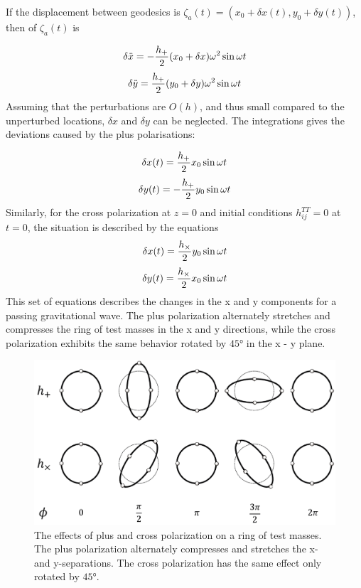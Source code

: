 \documentclass[binding=0.6cm, LaM]{sapthesis}
\begin{document}
If the displacement between geodesics is $\zeta_a (t) = (x_0 + \delta x(t), y_0 + \delta y(t))$, then of $\zeta_a (t)$ is 

\begin{equation}
\delta {\ddot x} = - {{h_{+}} \over 2} (x_0 + \delta x) \omega ^2 \sin \omega t
\end{equation}
\begin{equation}
\delta {\ddot y} =  {{h_{+}} \over 2} (y_0 + \delta y) \omega ^2 \sin \omega t
\end{equation}
Assuming that the perturbations are $O(h)$, and thus small compared to the unperturbed locations, $\delta x$ and $\delta y$ can be neglected.
The integrations gives the deviations caused by the plus polarisations:

\begin{equation}
\delta x(t) =  {{h_{+}} \over 2} x_0 \sin \omega t
\end{equation}
\begin{equation}
\delta y(t) = - {{h_{+}} \over 2} y_0  \sin \omega t
\end{equation}
Similarly, for the cross polarization at $z=0$ and initial conditions $h_{ij}^{TT} = 0$ at $t= 0$, the situation is described by the equations
\begin{equation}
\delta x(t) =  {{h_{\times}} \over 2} y_0 \sin \omega t
\end{equation}
\begin{equation}
\delta y(t) =  {{h_{\times}} \over 2} x_0  \sin \omega t
\end{equation}
This set of equations describes the changes in the x and y components for a passing gravitational wave. 
The plus polarization alternately stretches and compresses the ring of test masses in the x and y directions, while the cross polarization exhibits the same behavior rotated by $\ang{45}$ in the x - y
 plane. 

\begin{figure}
\includegraphics[scale=1]{ring}
\centering
\caption{The effects of plus and cross polarization on a ring of test masses. The plus polarization alternately compresses and stretches the x- and y-separations. 
The cross polarization has the same effect only rotated by  $\ang{45}$.}
\label{fig:ring}
\end{figure}
\end{document}
